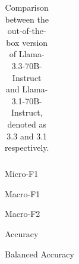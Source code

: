 \begin{table}[ht]
\begin{threeparttable}
\begin{tabular}{llcc}
   \hline
  \end{tabular}
  \begin{tablenotes}
    \item[$\bigstar$]Micro-F1
    \item[$\dag$]Macro-F1
    \item[$\triangle$]Macro-F2
    \item[$\S$]Accuracy
    \item[$\blacktriangle$]Balanced Accuracy
  \end{tablenotes}
  \end{threeparttable}
  \caption{\label{table:llama}
    Comparison between the out-of-the-box version of Llama-3.3-70B-Instruct and Llama-3.1-70B-Instruct, denoted as 3.3 and 3.1 respectively.
  }
\end{table}